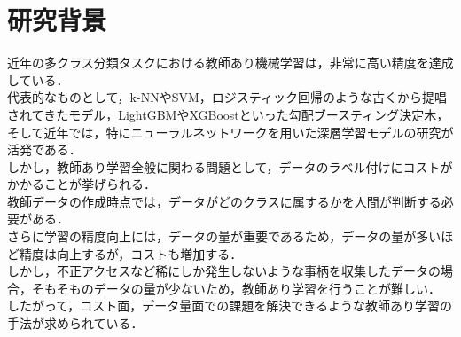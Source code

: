 \section{研究背景}

近年の多クラス分類タスクにおける教師あり機械学習は，非常に高い精度を達成している．\\
代表的なものとして，k-NN\cite{knn}やSVM\cite{svm}，ロジスティック回帰のような古くから提唱されてきたモデル，LightGBM\cite{lightgbm}やXGBoost\cite{xgboost}といった勾配ブースティング決定木，そして近年では，特にニューラルネットワークを用いた深層学習モデルの研究が活発である．\\
しかし，教師あり学習全般に関わる問題として，データのラベル付けにコストがかかることが挙げられる．\\
教師データの作成時点では，データがどのクラスに属するかを人間が判断する必要がある．\\
さらに学習の精度向上には，データの量が重要であるため，データの量が多いほど精度は向上するが，コストも増加する．\\
しかし，不正アクセスなど稀にしか発生しないような事柄を収集したデータの場合，そもそものデータの量が少ないため，教師あり学習を行うことが難しい．\\
したがって，コスト面，データ量面での課題を解決できるような教師あり学習の手法が求められている．\\

